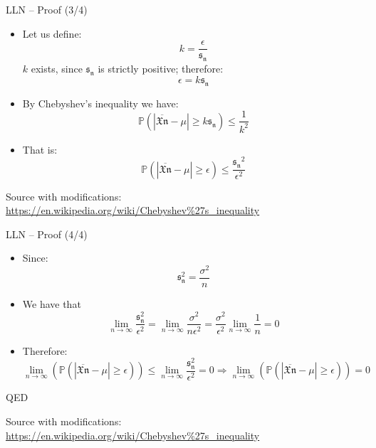 \documentclass{beamer}
\begin{document}
\begin{frame}
{\centerline{LLN -- Proof (3/4)}}

\begin{itemize}
\item Let us define:\\
$$k = \frac{\epsilon}{\mathfrak{s_n}}$$
$k$ exists, since $\mathfrak{s_n}$ is strictly positive; therefore:
$$\epsilon = k\mathfrak{s_n}$$
\item By Chebyshev's inequality we have:
$$\mathbb{P} ( |\overline{\mathfrak{Xn}} - \mu|  \geq k\mathfrak{s_n}) \leq  \frac{1}{k^2}$$
\item That is:
$$\mathbb{P} ( |\overline{\mathfrak{Xn}} - \mu|  \geq \epsilon) \leq  \frac{\mathfrak{s_n}^2}{\epsilon^2}$$

\end{itemize}


\begin{center}
\tiny 
Source with modifications: \url{https://en.wikipedia.org/wiki/Chebyshev\%27s_inequality}
\end{center}
\end{frame}


\begin{frame}
{\centerline{LLN -- Proof (4/4)}}

\begin{itemize}

\item Since:
$$  \mathfrak{s_n^2} = \frac{\sigma^2}{n} $$
\item We have that
$$ \lim_{n \to \infty} \frac{\mathfrak{s_n^2}}{\epsilon^2}
= \lim_{n \to \infty} \frac{\sigma^2}{n\epsilon^2}
= \frac{\sigma^2}{\epsilon^2} \lim_{n \to \infty} \frac{1}{n}
= 0$$
\item Therefore:
$$  \lim_{n \to \infty} \left ( \mathbb{P} ( |\overline{\mathfrak{Xn}} - \mu| \geq \epsilon) \right ) \leq  \lim_{n \to \infty} \frac{\mathfrak{s_n^2}}{\epsilon^2} = 0 
\Rightarrow 
\lim_{n \to \infty} \left ( \mathbb{P} ( |\overline{\mathfrak{Xn}} - \mu| \geq \epsilon) \right ) = 0 $$
\end{itemize} 
QED



\begin{center}
\tiny 
Source with modifications: \url{https://en.wikipedia.org/wiki/Chebyshev\%27s_inequality}
\end{center}
\end{frame}
\end{document}
